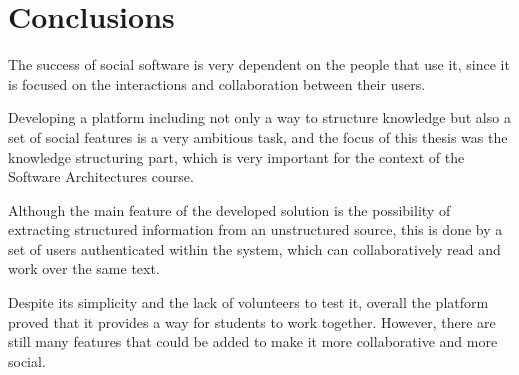 \documentclass[conference]{IEEEtran}
\begin{document}
\section{Conclusions}
The success of social software is very dependent on the people that use it, since it is focused on the interactions and collaboration between their users.

Developing a platform including not only a way to structure knowledge but also a set of social features is a very ambitious task, and the focus of this thesis was the knowledge structuring part, which is very important for the context of the Software Architectures course.

Although the main feature of the developed solution is the possibility of extracting structured information from an unstructured source, this is done by a set of users authenticated within the system, which can collaboratively read and work over the same text.

Despite its simplicity and the lack of volunteers to test it, overall the platform proved that it provides a way for students to work together. However, there are still many features that could be added to make it more collaborative and more social.

  
  

\end{document}
